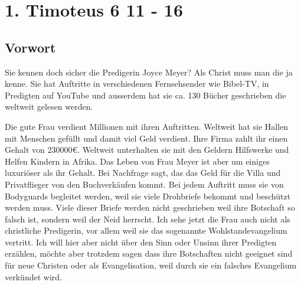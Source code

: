 \documentclass[12pt]{../../inc/mybib}
\author{Lothar Schmid}
\begin{document}
\section{1. Timoteus 6 11 - 16}

\subsection{Vorwort}
Sie kennen doch sicher die Predigerin Joyce Meyer? Als Christ muss man die ja kenne. Sie hat Auftritte in verschiedenen Fernsehsender wie Bibel-TV, in Predigten auf YouTube und ausserdem hat sie ca. 130 Bücher geschrieben die weltweit gelesen werden.

Die gute Frau verdient Millionen mit ihren Auftritten. Weltweit hat sie Hallen mit Menschen gefüllt und damit viel Geld verdient. Ihre Firma zahlt ihr einen Gehalt von 230000€. Weltweit unterhalten sie mit den Geldern Hilfswerke und Helfen Kindern in Afrika. Das Leben von Frau Meyer ist aber um einiges luxuriöser als ihr Gehalt. Bei Nachfrage sagt, das das Geld für die Villa und Privatflieger von den Buchverkäufen kommt. Bei jedem Auftritt muss sie von Bodyguards begleitet werden, weil sie viele Drohbriefe bekommt und beschützt werden muss. Viele dieser Briefe werden nicht geschrieben weil ihre Botschaft so falsch ist, sondern weil der Neid herrscht. Ich sehe jetzt die Frau auch nicht als christliche Predigerin, vor allem weil sie das sogenannte Wohlstandevangelium vertritt. Ich will hier aber nicht über den Sinn oder Unsinn ihrer Predigten erzählen, möchte aber trotzdem sagen dass ihre Botschaften nicht geeignet sind für neue Christen oder als Evangelisation, weil durch sie ein falsches Evangelium verkündet wird.
\end{document}
